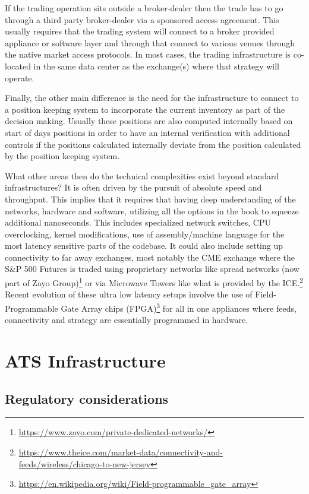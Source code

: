 If the trading operation sits outside a broker-dealer then the trade has to go through a third party broker-dealer via a sponsored access agreement. This usually requires that the trading system will connect to a broker provided appliance or software layer and through that connect to various venues through the native market access protocols. In most cases, the trading infrastructure is co-located in the same data center as the exchange(s) where that strategy will operate.


Finally, the other main difference is the need for the infrastructure to connect to a position keeping system to incorporate the current inventory as part of the decision making. Usually these positions are also computed internally based on start of days positions in order to have an internal verification with additional controls if the positions calculated internally deviate from the position calculated by the position keeping system.


What other areas then do the technical complexities exist beyond standard infrastructures? It is often driven by the pursuit of absolute speed and throughput. This implies that it requires that having deep understanding of the networks, hardware and software, utilizing all the options in the book to squeeze additional nanoseconds. This includes specialized network switches, CPU overclocking, kernel modifications, use of assembly/machine language for the most latency sensitive parts of the codebase. It could also include setting up connectivity to far away exchanges, most notably the CME exchange where the S\&P 500 Futures is traded using proprietary networks like spread networks (now part of Zayo Group)\footnote{\url{https://www.zayo.com/private-dedicated-networks/}} or via Microwave Towers like what is provided by the ICE.\footnote{\url{https://www.theice.com/market-data/connectivity-and-feeds/wireless/chicago-to-new-jersey}} Recent evolution of these ultra low latency setups involve the use of Field-Programmable Gate Array chips (FPGA)\footnote{\url{https://en.wikipedia.org/wiki/Field-programmable_gate_array}} for all in one appliances where  feeds, connectivity and strategy are essentially programmed in hardware.


\section{ATS Infrastructure}

\subsection{Regulatory considerations}

